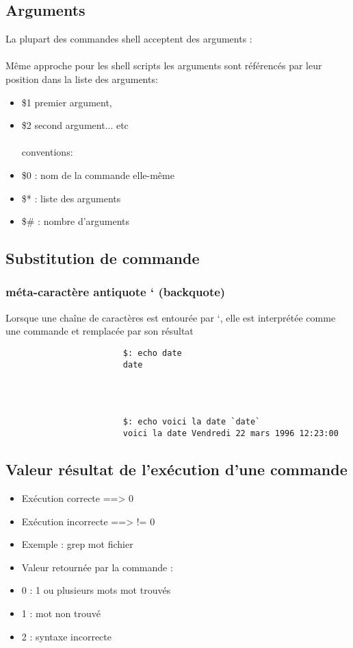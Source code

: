 			\subsection{Arguments}
				La plupart des commandes shell acceptent des arguments :\\ \\
				Même approche pour les shell scripts les arguments sont référencés par leur position dans la liste des arguments:
				\begin{itemize}				
					\item \$1 premier argument,
					\item \$2 second argument... etc \\ \\
					conventions:
					\item \$0 : nom de la commande elle-même
					\item \$* : liste des arguments
					\item \$# : nombre d'arguments
				\end{itemize}	
			\subsection{Substitution de commande}
				\subsubsection{méta-caractère antiquote ` (backquote)}
					Lorsque une chaîne de caractères est entourée par `, elle est interprétée comme une commande et remplacée par son résultat		
					\begin{verbatim}	
						$: echo date
						date
					\end{verbatim}\\ \\
					\begin{verbatim}	
						$: echo voici la date `date`
						voici la date Vendredi 22 mars 1996 12:23:00
					\end{verbatim}					
				
			\subsection{Valeur résultat de l'exécution d'une commande}
				\begin{itemize}							
					\item Exécution correcte ==> 0 
					\item Exécution incorrecte ==> != 0
					\item Exemple : grep mot fichier
					\item Valeur retournée par la commande :
					\item 0 : 1 ou plusieurs mots mot trouvés
					\item 1 : mot non trouvé
					\item 2 : syntaxe incorrecte
				\end{itemize}
